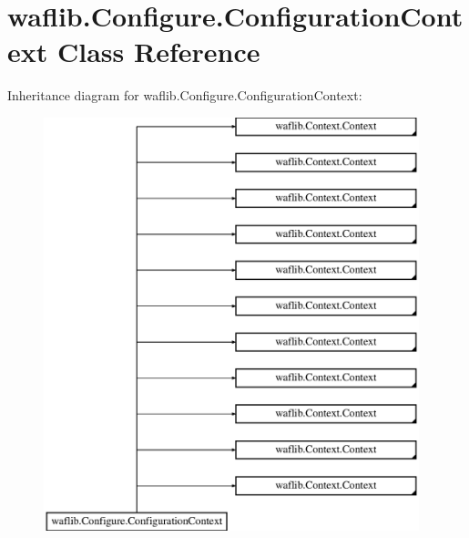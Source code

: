 \hypertarget{classwaflib_1_1_configure_1_1_configuration_context}{}\section{waflib.\+Configure.\+Configuration\+Context Class Reference}
\label{classwaflib_1_1_configure_1_1_configuration_context}
Inheritance diagram for waflib.\+Configure.\+Configuration\+Context\+:\begin{figure}[H]
\begin{center}
\leavevmode
\includegraphics[height=12.000000cm]{classwaflib_1_1_configure_1_1_configuration_context}
\end{center}
\end{figure}
